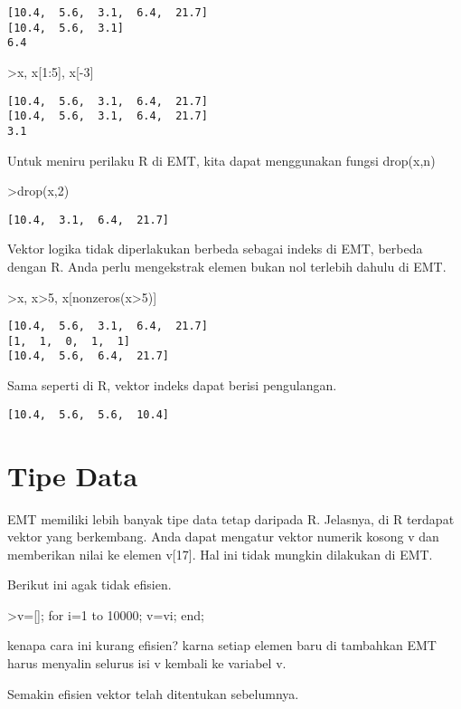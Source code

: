 \documentclass[
]{book}
\begin{document}
\begin{verbatim}
[10.4,  5.6,  3.1,  6.4,  21.7]
[10.4,  5.6,  3.1]
6.4
\end{verbatim}

\textgreater x, x{[}1:5{]}, x{[}-3{]}

\begin{verbatim}
[10.4,  5.6,  3.1,  6.4,  21.7]
[10.4,  5.6,  3.1,  6.4,  21.7]
3.1
\end{verbatim}

Untuk meniru perilaku R di EMT, kita dapat menggunakan fungsi drop(x,n)

\textgreater drop(x,2)

\begin{verbatim}
[10.4,  3.1,  6.4,  21.7]
\end{verbatim}

Vektor logika tidak diperlakukan berbeda sebagai indeks di EMT, berbeda dengan R. Anda perlu mengekstrak elemen bukan nol terlebih dahulu di EMT.

\textgreater x, x\textgreater5, x{[}nonzeros(x\textgreater5){]}

\begin{verbatim}
[10.4,  5.6,  3.1,  6.4,  21.7]
[1,  1,  0,  1,  1]
[10.4,  5.6,  6.4,  21.7]
\end{verbatim}

Sama seperti di R, vektor indeks dapat berisi pengulangan.

\begin{verbatim}
[10.4,  5.6,  5.6,  10.4]
\end{verbatim}

\chapter{Tipe Data}\label{tipe-data}

EMT memiliki lebih banyak tipe data tetap daripada R. Jelasnya, di R terdapat vektor yang berkembang. Anda dapat mengatur vektor numerik kosong v dan memberikan nilai ke elemen v{[}17{]}. Hal ini tidak mungkin dilakukan di EMT.

Berikut ini agak tidak efisien.

\textgreater v={[}{]}; for i=1 to 10000; v=v\textbar i; end;

kenapa cara ini kurang efisien? karna setiap elemen baru di tambahkan EMT harus menyalin selurus isi v kembali ke variabel v.

Semakin efisien vektor telah ditentukan sebelumnya.
\end{document}
